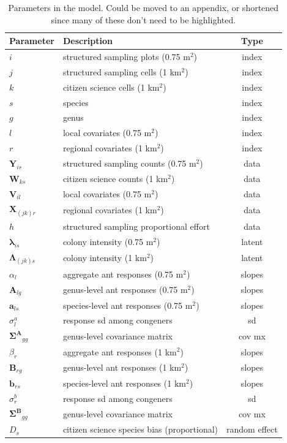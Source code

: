\documentclass[preprint,review,times,12pt]{elsarticle}
\begin{document}
\begin{table}[ht]
	\centering
	\begin{tabular}{ l l c }
		\hline
		\textbf{Parameter} & \textbf{Description} & \textbf{Type} \\
		\hline
		$i$ & structured sampling plots (0.75 m$^2$) & index \\
		$j$ & structured sampling cells (1 km$^2$) & index \\
		$k$ & citizen science cells (1 km$^2$) & index \\
		$s$ & species & index \\
		$g$ & genus & index \\
		$l$ & local covariates (0.75 m$^2$) & index \\
		$r$ & regional covariates (1 km$^2$) & index \\
		\hline
		$\mathbf{Y}_{is}$ & structured sampling counts (0.75 m$^2$) & data \\
		$\mathbf{W}_{ks}$ & citizen science counts (1 km$^2$) & data \\
		$\mathbf{V}_{il}$ & local covariates (0.75 m$^2$) & data \\
		$\mathbf{X}_{(jk)r}$ & regional covariates (1 km$^2$) & data \\
		$h$ & structured sampling proportional effort & data \\
		\hline
		$\mathbf{\lambda}_{is}$ & colony intensity (0.75 m$^2$) & latent \\
		$\mathbf{\Lambda}_{(jk)s}$ & colony intensity (1 km$^2$) & latent \\
		\hline
		$\alpha_{l}$ & aggregate ant responses (0.75 m$^2$) & slopes \\
		$\mathbf{A}_{lg}$ & genus-level ant responses (0.75 m$^2$) & slopes \\
		$\mathbf{a}_{ls}$ & species-level ant responses (0.75 m$^2$) & slopes \\
		$\sigma^a_{l}$ & response sd among congeners & sd \\
		$\mathbf{\Sigma^A}_{gg}$ & genus-level covariance matrix & cov mx \\
		$\beta_{r}$ & aggregate ant responses (1 km$^2$) & slopes \\
		$\mathbf{B}_{rg}$ & genus-level ant responses (1 km$^2$) & slopes \\
		$\mathbf{b}_{rs}$ & species-level ant responses (1 km$^2$) & slopes \\
		$\sigma^b_{r}$ & response sd among congeners & sd \\
		$\mathbf{\Sigma^B}_{gg}$ & genus-level covariance matrix & cov mx \\
		$D_{s}$ & citizen science species bias (proportional) & random effect \\
	\end{tabular}
	\caption{\label{table:params} Parameters in the model. Could be moved to an appendix, or shortened since many of these don't need to be highlighted. }
\end{table}
\end{document}
